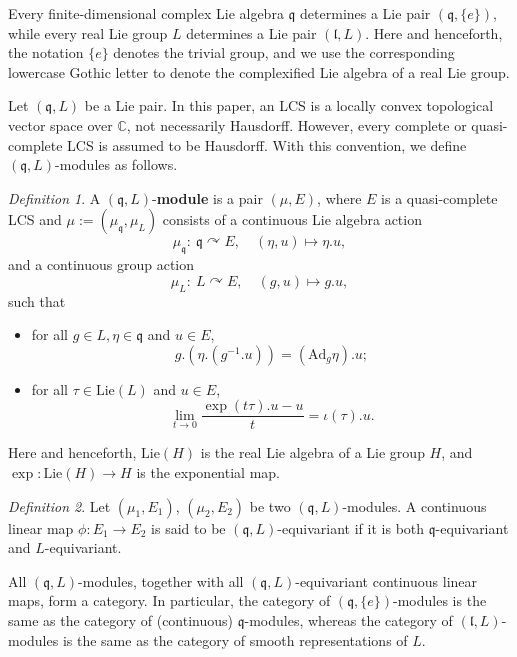 \documentclass[12pt, a4paper]{amsart}
\newcommand{\Ad}{{\mathrm{Ad}}}
\newcommand{\Lie}{{\mathrm{Lie}}}
\newcommand{\q}{\mathfrak q}
\renewcommand{\l}{\mathfrak l}
\newcommand{\C}{\mathbb{C}}
\newcommand{\be}{\begin {equation}}
\newcommand{\ee}{\end {equation}}
\theoremstyle{Theorem}
\theoremstyle{Theorem}
\theoremstyle{Theorem}
\theoremstyle{Theorem}
\theoremstyle{Plain}
\theoremstyle{remark}
\theoremstyle{remark}
\theoremstyle{Definition}
\newtheorem{dfn}{Definition}[section]
\numberwithin{equation}{section}
\begin{document}
Every finite-dimensional complex Lie algebra $\mathfrak{q}$ determines a Lie pair $(\mathfrak{q},\{e\})$, while every real Lie group $L$ determines a Lie pair $(\mathfrak{l},L)$. Here and henceforth, the notation $\{e\}$ denotes the trivial group, and we use the corresponding lowercase Gothic letter to denote the complexified Lie algebra of a real Lie group.


Let $(\q,L)$ be a Lie pair.
In this paper, an LCS is a locally convex topological vector space over $\C$, not necessarily Hausdorff. However, every complete or quasi-complete LCS is assumed to be Hausdorff. 
With this convention, we define $(\q,L)$-modules as follows.
\begin{dfn}\label{def:ofqLmod}
	 A $(\q,L)$-\textbf{module} is a pair $(\mu,E)$, where $E$ is  a  quasi-complete LCS and $\mu:=(\mu_{\q},\mu_L)$ consists of a continuous Lie algebra action \[\mu_\q:\ \q\curvearrowright E, \quad (\eta,u)\mapsto \eta.u,\]
	and a continuous group action \[\mu_L:\ L\curvearrowright E, \quad (g,u)\mapsto g.u, \] such that 
	\begin{itemize}
		\item  for all $g\in L, \eta \in \q$ and $ u\in E$, \be\label{eq:qLmodule1} g.(\eta.(g^{-1}.u))=(\Ad_g \eta).u;\ee
		\item for all $\tau \in\Lie(L)$ and $ u\in E$, 
  \be\label{eq:qLmodule2} \lim_{t\rightarrow0}\frac{\exp (t\tau).u-u}{t}=\iota(\tau).u. \ee
  \end{itemize}
\end{dfn}
Here and henceforth,  $\Lie(H)$ is the real Lie algebra of a Lie group $H$, and $\exp: \Lie(H)\rightarrow H $ is the exponential map. 

\begin{dfn}
	Let $(\mu_1,E_1)$, $(\mu_2,E_2)$ be two $(\q,L)$-modules. A continuous linear map $\phi: E_1\rightarrow E_2$ is said to be  $(\q,L)$-equivariant if it is both $\q$-equivariant and $L$-equivariant. 
\end{dfn}
All $(\q, L)$-modules, together with all $(\q, L)$-equivariant continuous linear maps, form a category. 
In particular, the category of $(\q,\{e\})$-modules is the same as  the category of (continuous) $\q$-modules, whereas the category of $(\l,L)$-modules is the same as the category of smooth representations of $L$.
\end{document}
